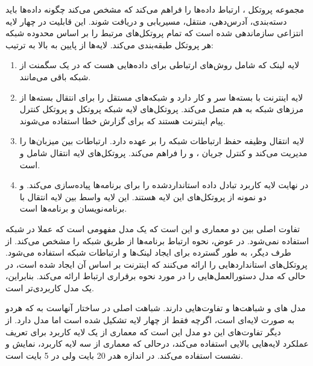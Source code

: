 \documentclass{article}
\begin{document}
مجموعه پروتکل ، ارتباط  داده‌ها را فراهم می‌کند که مشخص می‌کند چگونه داده‌ها باید دسته‌بندی، آدرس‌دهی، منتقل، مسیریابی و دریافت شوند.
این قابلیت در چهار لایه انتزاعی سازماندهی شده است که تمام پروتکل‌های مرتبط را بر اساس محدوده شبکه هر پروتکل طبقه‌بندی می‌کند. لایه‌ها از پایین به بالا به ترتیب:
\begin{enumerate}
	\item
	  لایه لینک  که شامل روش‌های ارتباطی برای داده‌هایی هست که در یک سگمنت از شبکه باقی می‌مانند. 
	\item 
	لایه اینترنت  با بسته‌ها سر و کار دارد و شبکه‌های مستقل را برای انتقال بسته‌ها از مرزهای شبکه به هم متصل می‌کند. پروتکل‌های لایه شبکه پروتکل  و پروتکل کنترل پیام اینترنت  هستند که برای گزارش خطا استفاده می‌شوند. 
	\item
	لایه انتقال  وظیفه حفظ ارتباطات  شبکه را بر عهده دارد.  ارتباطات بین میزبان‌ها را مدیریت می‌کند و کنترل جریان ،  و  را فراهم می‌کند. پروتکل‌های لایه انتقال شامل  و  است. 
	\item
	در نهایت لایه کاربرد  تبادل داده استاندارد‌شده را برای برنامه‌ها پیاده‌سازی می‌کند.  و  دو نمونه از پروتکل‌های این لایه هستند. این لایه واسط بین لایه انتقال با برنامه‌نویسان و برنامه‌ها است.
\end{enumerate}

تفاوت اصلی بین دو معماری  و  این است که  یک مدل مفهومی است که عملا در شبکه استفاده نمی‌شود. در عوض، نحوه ارتباط برنامه‌ها از طریق شبکه را مشخص می‌کند. از طرف دیگر،  به طور گسترده برای ایجاد لینک‌ها و ارتباطات شبکه استفاده می‌شود.
پروتکل‌های  استانداردهایی را ارائه می‌کنند که اینترنت بر اساس آن ایجاد شده است، در حالی که مدل  دستورالعمل‌هایی را در مورد نحوه برقراری ارتباط ارائه می‌کند. بنابراین،  یک مدل کاربردی‌تر است.

مدل های  و  شباهت‌ها و تفاوت‌هایی دارند. شباهت اصلی در ساختار آنهاست به که هردو به صورت لایه‌ای است، اگرچه  فقط از چهار لایه تشکیل شده است اما مدل  دارد.
از دیگر تفاوت‌های این دو مدل این است که معماری  از یک لایه کاربرد برای تعریف عملکرد لایه‌هایی بالایی استفاده می‌کند، درحالی که معماری  از سه لایه کاربرد، نمایش و نشست استفاده می‌کند. در  اندازه هدر  20 بایت ولی در  5 بایت است. 
\end{document}
